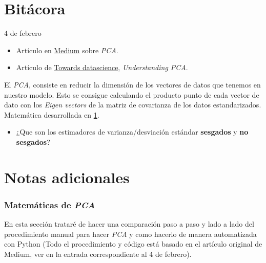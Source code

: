 
\maketitle

\part{Bitácora}
\begin{entry}{4 de febrero}
\tcbsubtitle{\LBlimportant}
\begin{itemize}
    \item Artículo en \href{https://medium.com/codex/principal-component-analysis-pca-how-it-works-mathematically-d5de4c7138e6}{Medium} sobre \textit{PCA}.
    
    \item Artículo de \href{https://towardsdatascience.com/understanding-pca-fae3e243731d}{Towards datascience}, \textit{Understanding PCA}.
\end{itemize}
\tcblower
\tcbsubtitle{\LBlsummary}
El \textit{PCA}, consiste en reducir la dimensión de los vectores de datos que tenemos en nuestro modelo. Esto se consigue calculando el producto punto de cada vector de dato con los \textit{Eigen vectors} de la matriz de covarianza de los datos estandarizados. Matemática desarrollada en \ref{PCAmath}.
\vspace{0.4em}
\tcbsubtitle{\LBltodo}
\begin{itemize}
    \item ¿Que son los estimadores de varianza/desviación estándar \textbf{sesgados} y \textbf{no sesgados}?
\end{itemize}
\end{entry}

\newpage

\part{Notas adicionales}
\section{Matemáticas de \textit{PCA}}\label{PCAmath}
En esta sección trataré de hacer una comparación paso a paso y lado a lado del procedimiento manual para hacer \textit{PCA} y como hacerlo de manera automatizada con Python (Todo el procedimiento y código está basado en el artículo original de Medium, ver en la entrada correspondiente al 4 de febrero).
